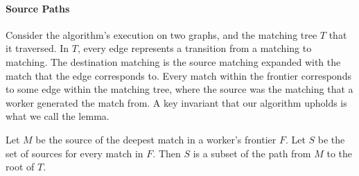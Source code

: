 %

\paragraph{Source Paths}
Consider the algorithm's execution on two graphs,
and the matching tree $T$ that it traversed.
%
In $T$, every edge represents a transition
from a  matching to  matching.
%
The destination matching is the source matching expanded
with the match that the edge corresponds to.
%
Every match within the frontier corresponds to some
edge within the matching tree, where the source was the
matching that a worker generated the match from.
%
A key invariant that our algorithm upholds is what
we call the  lemma.

\begin{lemma}
Let $M$ be the source of the deepest match in a worker's frontier $F$.
%
Let $S$ be the set of sources for every match in $F$.
%
Then $S$ is a subset of the path from $M$ to the root
of $T$.
\end{lemma}

